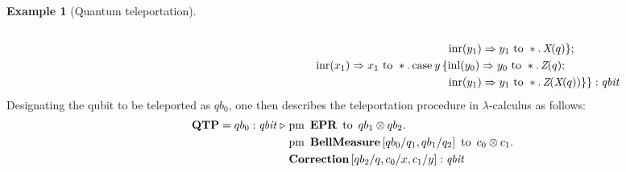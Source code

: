 \documentclass[10pt,a4paper]{amsart}
\theoremstyle{definition}
\theoremstyle{definition}
\newtheorem{example}[definition]{Example}
\theoremstyle{definition}
\theoremstyle{definition}
\theoremstyle{definition}
\theoremstyle{definition}
\begin{document}
\begin{example}[Quantum teleportation]
\begin{align*}
                \\
   &   \hspace{333pt} \inr (y_{1}) \Rightarrow y_1 \text{ to } \ast. \, \emph{X}
(q)\} ; \\ 
   & \hspace{215pt}\inr (x_{1})  \Rightarrow x_1 \text{ to } \ast. \,
        \text{case}\hspace{2pt} y\,  \{\inl (y_{0})  \Rightarrow
        y_0 \text{ to } \ast. \, \emph{Z}(q);  
\\ 
   &\hspace{333pt} \inr (y_{1}) \Rightarrow{} y_1 \text{ to } \ast. \, \emph{Z}
(\emph{X}(q)) \}\} : \emph{qbit}
\end{align*}
Designating the qubit to be teleported as $qb_0$, one then describes the
teleportation procedure in $\lambda$-calculus as follows:
 \begin{align*}
  \textbf{QTP} = qb_{0}: \textit{qbit}\hspace{3 pt} \triangleright \hspace{3 pt} & \text{pm} \hspace{5pt} \textbf{EPR} \hspace{5pt} \text{to} \hspace{5pt}  qb_{1} \otimes qb_{2}.  \notag \\
     & \text{pm}\hspace{5pt} \textbf{BellMeasure}\, [qb_0/q_1,qb_{1}/q_2] \hspace{5pt}  \text{to} \hspace{5pt} c_{0}\otimes c_{1} . \notag \\
     & \textbf{Correction}\, [qb_{2}/q,c_{0}/x, c_{1}/y] 
     : \emph{qbit} 
 \end{align*}

\end{example}

~
\end{document}
